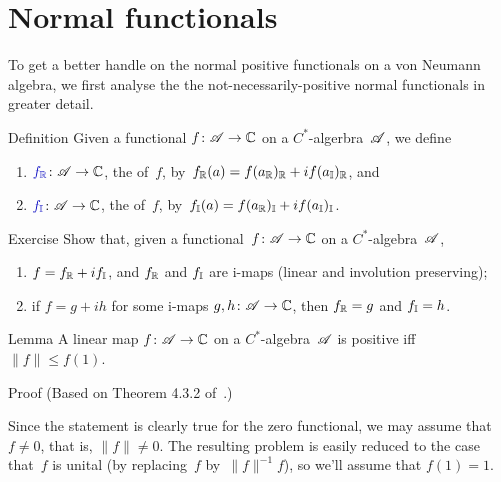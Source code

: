 \documentclass[a]{subfiles}
\begin{document}
\section{Normal functionals}
\begin{parsec}%
\begin{point}%
To get a better handle on the normal positive functionals
on a von Neumann algebra,
we first analyse the the not-necessarily-positive normal functionals
in greater detail.
\end{point}
\begin{point}{Definition}%
Given a functional $f\colon \mathscr{A}\to \mathbb{C}$
on a $C^*$-algerbra~$\mathscr{A}$,
we define
\begin{enumerate}
\item
$\Define{\Real{f}}\colon \scrA\to\C$,
the  of~$f$,
by~$f_{\mathbb{R}}(a)=f(a_{\mathbb{R}})_{\mathbb{R}}
+if(a_{\mathbb{I}})_{\mathbb{R}}$, and
\item
$\Define{\Imag{f}}\colon \scrA\to\C$,
the  of~$f$,
by~$f_{\mathbb{I}}(a)=f(a_{\mathbb{R}})_{\mathbb{I}}
+if(a_{\mathbb{I}})_{\mathbb{I}}$.
\end{enumerate}
\end{point}
\begin{point}{Exercise}%
Show that,
given a functional~$f\colon \mathscr{A}\to \mathbb{C}$
on a $C^*$-algebra~$\mathscr{A}$,
\begin{enumerate}
\item
	$f=f_{\mathbb{R}}+if_{\mathbb{I}}$, and 
	$f_{\mathbb{R}}$ and $f_{\mathbb{I}}$
	are i-maps (linear and involution preserving);
\item
	if $f=g+ih$ for some i-maps
	$g,h\colon \mathscr{A}\to\mathbb{C}$,
	then $f_{\mathbb{R}}=g$ and $f_{\mathbb{I}}=h$.
\end{enumerate}
\end{point}
\begin{point}{Lemma}%
A linear map $f\colon \mathscr{A}\to \mathbb{C}$
on a $C^*$-algebra~$\mathscr{A}$
is positive iff $\|f\|\leq f(1)$.
\begin{point}{Proof}%
(Based on Theorem 4.3.2 of~\cite{kr}.)

Since the statement is clearly true for the zero functional,
we may assume that~$f\neq 0$, that is, $\|f\|\neq 0$.
The resulting
problem is  easily reduced
to the case that~$f$ is unital
(by replacing~$f$ by~$\|f\|^{-1}f $), so we'll assume that $f(1)=1$.


\end{point}
\end{point}
\end{parsec}
\end{document}

